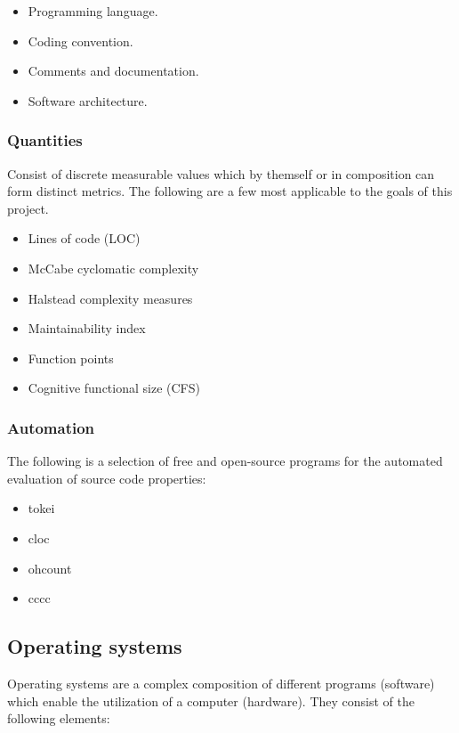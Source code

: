 \begin{itemize}
    \item Programming language.
    \item Coding convention.
    \item Comments and documentation.
    \item Software architecture.
\end{itemize}

\subsubsection{Quantities}

Consist of discrete measurable values which by themself or in composition can form distinct metrics. The following are a few most applicable to the goals of this project.

\begin{itemize}
    \item Lines of code (LOC)
    \item McCabe cyclomatic complexity
    \item Halstead complexity measures
    \item Maintainability index
    \item Function points
    \item Cognitive functional size (CFS)
\end{itemize}

\subsubsection{Automation}

The following is a selection of free and open-source programs for the automated evaluation of source code properties:

\begin{itemize}
    \item tokei \cite{tokei}
    \item cloc \cite{cloc}
    \item ohcount \cite{ohcount}
    \item cccc \cite{cccc}
\end{itemize}

\subsection{Operating systems}

Operating systems are a complex composition of different programs (software) which enable the utilization of a computer (hardware). They consist of the following elements:

